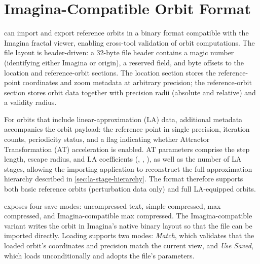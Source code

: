 \section{Imagina-Compatible Orbit Format}
\label{subsec:imagina-format}

\FractalShark{} can import and export reference orbits in a binary format
compatible with the Imagina fractal viewer, enabling cross-tool validation of
orbit computations.  The file layout is header-driven: a 32-byte file header
contains a magic number (identifying either Imagina or \FractalShark{} origin), a
reserved field, and byte offsets to the location and reference-orbit sections.
The location section stores the reference-point coordinates and zoom metadata at
arbitrary precision; the reference-orbit section stores orbit data together with
precision radii (absolute and relative) and a validity radius.

For orbits that include linear-approximation (LA) data, additional metadata
accompanies the orbit payload: the reference point in single precision,
iteration counts, periodicity status, and a flag indicating whether Attractor
Transformation (AT) acceleration is enabled.  AT parameters comprise the step
length, escape radius, and LA coefficients (, ,
), as well as the number of LA stages, allowing the importing
application to reconstruct the full approximation hierarchy described in
\cref{sec:la-stage-hierarchy}.  The format therefore supports both basic
reference orbits (perturbation data only) and full LA-equipped orbits.

\FractalShark{} exposes four save modes: uncompressed text, simple compressed,
max compressed, and Imagina-compatible max compressed.  The Imagina-compatible
variant writes the orbit in Imagina's native binary layout so that the file can
be imported directly.  Loading supports two modes: \emph{Match}, which validates
that the loaded orbit's coordinates and precision match the current view, and
\emph{Use Saved}, which loads unconditionally and adopts the file's parameters.
